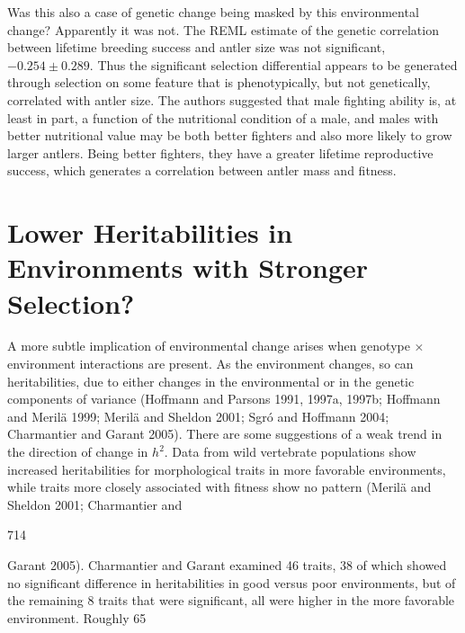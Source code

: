 \documentclass{article}
\begin{document}
Was this also a case of genetic change being masked by this environmental change? Apparently it was not. The REML estimate of the genetic correlation between lifetime breeding success and antler size was not significant,  $ -0.254 \pm 0.289 $. Thus the significant selection differential appears to be generated through selection on some feature that is phenotypically, but not genetically, correlated with antler size. The authors suggested that male fighting ability is, at least in part, a function of the nutritional condition of a male, and males with better nutritional value may be both better fighters and also more likely to grow larger antlers. Being better fighters, they have a greater lifetime reproductive success, which generates a correlation between antler mass and fitness.

\section{Lower Heritabilities in Environments with Stronger Selection?}
A more subtle implication of environmental change arises when genotype × environment interactions are present. As the environment changes, so can heritabilities, due to either changes in the environmental or in the genetic components of variance (Hoffmann and Parsons 1991, 1997a, 1997b; Hoffmann and Merilä 1999; Merilä and Sheldon 2001; Sgró and Hoffmann 2004; Charmantier and Garant 2005). There are some suggestions of a weak trend in the direction of change in  $ h^{2} $. Data from wild vertebrate populations show increased heritabilities for morphological traits in more favorable environments, while traits more closely associated with fitness show no pattern (Merilä and Sheldon 2001; Charmantier and

714

Garant 2005). Charmantier and Garant examined 46 traits, 38 of which showed no significant difference in heritabilities in good versus poor environments, but of the remaining 8 traits that were significant, all were higher in the more favorable environment. Roughly 65%
\end{document}
